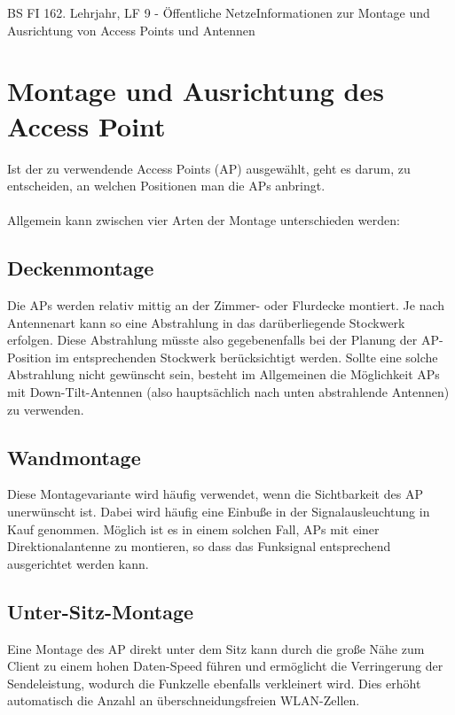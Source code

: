 \documentclass[11pt,twocolumn,oneside,openany,headings=optiontotoc,11pt,numbers=noenddot]{article}
\begin{document}
	\begin{worksheet}{BS FI 16}{2. Lehrjahr, LF 9 - Öffentliche Netze}{Informationen zur Montage und Ausrichtung von Access Points und Antennen}
		\section{Montage und Ausrichtung des Access Point}
		Ist der zu verwendende Access Points (AP) ausgewählt, geht es darum, zu entscheiden, an welchen Positionen man die APs anbringt.\\
		\\
		Allgemein kann zwischen vier Arten der Montage unterschieden werden:
		\subsection*{Deckenmontage} Die APs werden relativ mittig an der Zimmer- oder Flurdecke montiert. Je nach Antennenart kann so eine Abstrahlung in das darüberliegende Stockwerk erfolgen. Diese Abstrahlung müsste also gegebenenfalls bei der Planung der AP-Position im entsprechenden Stockwerk berücksichtigt werden. Sollte eine solche Abstrahlung nicht gewünscht sein, besteht im Allgemeinen die Möglichkeit APs mit Down-Tilt-Antennen (also hauptsächlich nach unten abstrahlende Antennen) zu verwenden.
		\subsection*{Wandmontage} Diese Montagevariante wird häufig verwendet, wenn die Sichtbarkeit des AP unerwünscht ist. Dabei wird häufig eine Einbuße in der Signalausleuchtung in Kauf genommen. Möglich ist es in einem solchen Fall, APs mit einer Direktionalantenne zu montieren, so dass das Funksignal entsprechend ausgerichtet werden kann.
		\subsection*{Unter-Sitz-Montage} Eine Montage des AP direkt unter dem Sitz kann durch die große Nähe zum Client zu einem hohen Daten-Speed führen und ermöglicht die Verringerung der Sendeleistung, wodurch die Funkzelle ebenfalls verkleinert wird. Dies erhöht automatisch die Anzahl an überschneidungsfreien WLAN-Zellen.

\end{worksheet}
\end{document}
